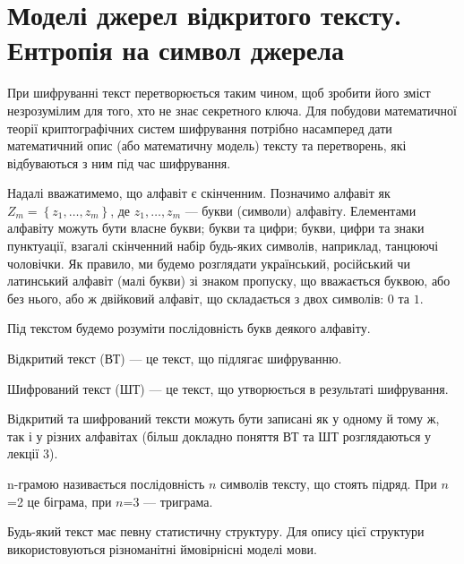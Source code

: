 \chapter{Моделі джерел відкритого тексту. Ентропія на символ джерела}

При шифруванні текст перетворюється таким чином, щоб зробити його зміст
незрозумілим для того, хто не знає секретного ключа. Для побудови математичної
теорії криптографічних систем шифрування потрібно насамперед дати математичний
опис (або математичну модель) тексту та перетворень, які відбуваються з ним під
час шифрування.

\begin{definition}[Алфавіт]
    Надалі вважатимемо, що алфавіт є скінченним.
    Позначимо алфавіт як $Z_m = \left\{z_1, \dots , z_m \right\}$, де
    $z_1, \dots , z_{m}$ --- букви (символи) алфавіту.
    Елементами алфавіту можуть бути власне букви; букви та цифри;
    букви, цифри та знаки пунктуації, взагалі скінченний набір
    будь-яких символів, наприклад, танцюючі чоловічки.
    Як правило, ми будемо розглядати український,
    російський чи латинський алфавіт (малі букви) зі знаком пропуску,
    що вважається буквою, або без нього, або ж двійковий алфавіт,
    що складається з двох символів: $0$ та $1$. 
\end{definition}
\begin{definition}[Текст]
    Під текстом будемо розуміти послідовність букв деякого алфавіту.
\end{definition}

\begin{definition} Відкритий текст (ВТ) --- це текст,
    що підлягає шифруванню.
\end{definition}
\begin{definition}Шифрований текст (ШТ) --- це текст,
    що утворюється в результаті шифрування.
\end{definition}

Відкритий та шифрований тексти можуть бути записані як у одному й тому ж,
так і у різних алфавітах (більш докладно поняття ВТ та ШТ
розглядаються у лекції 3).

\begin{definition}[n-грама]
n-грамою називається послідовність  $n$ символів тексту, що
стоять підряд. При  ${n}$=2 це біграма, при  ${n}$=3 --- триграма.
\end{definition}

Будь-який текст має певну статистичну структуру. Для опису цієї структури
використовуються різноманітні ймовірнісні моделі мови. 

